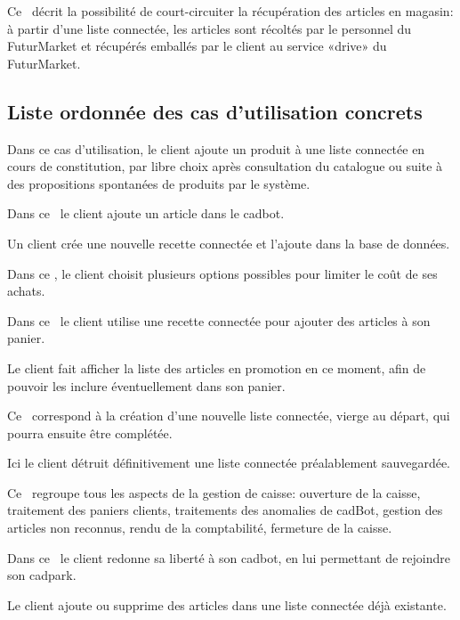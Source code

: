 Ce \cu\ décrit la possibilité de court-circuiter la récupération des articles en magasin: à partir d'une liste connectée, les articles sont récoltés par le personnel du FuturMarket et récupérés emballés par le client au service «drive» du FuturMarket.


\subsection{Liste ordonnée des cas d'utilisation concrets}

Dans ce cas d'utilisation, le client ajoute un produit à une liste connectée en cours de constitution, par libre choix après consultation du catalogue ou suite à des propositions spontanées de produits par le système.

Dans ce \cu\ le client ajoute un article dans le cadbot.

Un client crée une nouvelle recette connectée et l'ajoute dans la base de données.

Dans ce \cu, le client choisit plusieurs options possibles pour limiter le coût de ses achats.

Dans ce  \cu\ le client utilise une recette connectée pour ajouter des articles à son panier.

Le client fait afficher la liste des articles en promotion en ce moment, afin de pouvoir les inclure éventuellement dans son panier.

Ce \cu\ correspond à la création d'une nouvelle liste connectée, vierge au départ, qui pourra ensuite être complétée.

Ici le client détruit définitivement une liste connectée préalablement sauvegardée.

Ce \cu\ regroupe tous les aspects de la gestion de caisse: ouverture de la caisse, traitement des paniers clients, traitements des anomalies de cadBot, gestion des articles non reconnus, rendu de la comptabilité, fermeture de la caisse.

Dans ce \cu\ le client redonne sa liberté à son cadbot, en lui permettant de rejoindre son cadpark.

Le client ajoute ou supprime des articles dans une liste connectée déjà existante.

